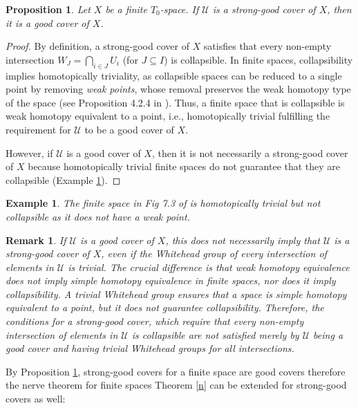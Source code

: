 \documentclass[12pt,a4paper,twoside, reqno, tbtags]{article}
\numberwithin{equation}{section}
\newtheorem{proposition}{Proposition}[section]
\newtheorem{example}{Example}[section]
\newtheorem{remark}{Remark}[section]
\begin{document}
\begin{proposition}\label{15}
Let $X$ be a finite $T_0$-space. If $\mathcal{U}$ is a strong-good cover of $X$, then it is a good cover of $X$.
\end{proposition}
\begin{proof}
 By definition, a strong-good cover of $X$ satisfies that every non-empty intersection \( W_J = \bigcap_{i \in J} U_i \) (for \( J \subseteq I \)) is collapsible.
 \noindent In finite spaces, collapsibility implies homotopically triviality, as collapsible spaces can be reduced to a single point by removing \emph{weak points}, whose removal preserves the weak homotopy type of the space (see Proposition 4.2.4 in \cite{Barmak}). Thus, a finite space that is collapsible is weak homotopy equivalent to a point, i.e., homotopically trivial fulfilling the requirement for $\mathcal{U}$ to be a good cover of $X$.

    \noindent However, if $\mathcal{U}$ is a good cover of $X$, then it is not necessarily a strong-good cover of $X$ because homotopically trivial finite spaces do not guarantee that they are collapsible (Example \ref{15a}).    
\end{proof}
    
\begin{example}\label{15a}
    The finite space in Fig 7.3 of \cite{Barmak} is homotopically trivial but not collapsible as it does not have a weak point.
\end{example}
\begin{remark}\label{16}
    If $\mathcal{U}$ is a good cover of $X$, this does not necessarily imply that $\mathcal{U}$ is a strong-good cover of $X$, even if the Whitehead group of every intersection of elements in $\mathcal{U}$ is trivial. The crucial difference is that weak homotopy equivalence does not imply simple homotopy equivalence in finite spaces, nor does it imply collapsibility. A trivial Whitehead group ensures that a space is simple homotopy equivalent to a point, but it does not guarantee collapsibility. Therefore, the conditions for a strong-good cover, which require that every non-empty intersection of elements in $\mathcal{U}$ is collapsible are not satisfied merely by $\mathcal{U}$ being a good cover and having trivial Whitehead groups for all intersections.
\end{remark}
    \noindent By Proposition \ref{15}, strong-good covers for a finite space are good covers therefore the nerve theorem for finite spaces  Theorem \ref{n} can be extended for strong-good covers as well:
\end{document}
